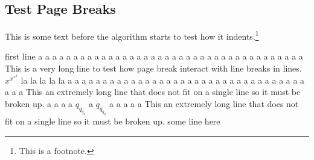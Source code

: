 \documentclass[a4paper]{article}
\begin{document}
	\subsection{Test Page Breaks}
	This is some text before the algorithm starts to test how it indents.\footnote{This is a footnote.}
	\begin{algorithmic}[1]
		\State first line
			\State a
			\State a
			\State a
			\State a
			\State a
				\State a
				\State a
				\State a
					\State a
					\State a
					\State a
					\State a
					\State a
					\State a
					\State a
					\State a
					\State a
					\State a
					\State a
					\State a
					\State a
					\State a
				\EndIf
				\State a
				\State a
				\State a
				\State a
				\State a
				\State a
				\State a
				\State a
				\State a
				\State a
				\State a
				\State a
				\State a
				\State a
				\State a
				\State a
				\State This is a very long line to test how page break interact with line breaks in lines.
				\State $x^{x^{x^2}}$ la la la la la
				\State a
				\State a
				\State a
				\State a
				\State a
				\State a
				\State a
				\State a
				\State a
				\State a
				\State a
				\State a
				\State a
				\State a
				\State a
				\State a
				\State a
				\State a
				\State a
				\State a
				\State a
				\State a
				\State a
				\State a
				\State a
				\State a
				\State a
				\State a
				\State a
				\State a
				\State a
				\State a
					\State a
					\State a
					\State a
					\State a
					\State a
					\State This an extremely long line that does not fit on a single line so it must be broken up.
					\State a
					\State a
					\State a
					\State a
					\State $q_{q_{q_q}}$
				\EndIf
				\State a
				\State $q_{q_{q_q}}$
				\State a
				\State a
				\State a
				\State a
				\If{$x > 0$}
					\State a
						\State This an extremely long line that does not fit on a single line so it must be broken up.
					\EndIf
				\EndIf
			\EndIf
			\State some line here
		\EndIf
    \end{algorithmic}

	\newpage
\end{document}
